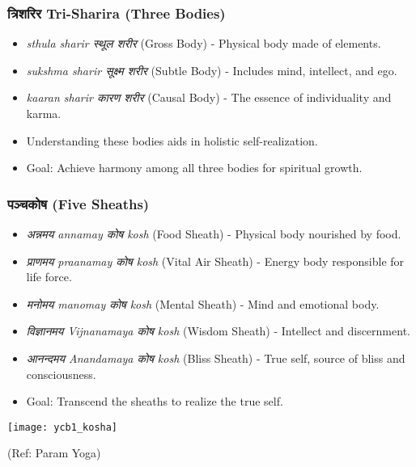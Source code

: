 \begin{frame}[fragile]\frametitle{त्रिशरिर  Tri-Sharira (Three Bodies)}

      \begin{itemize}
		\item \textit{sthula sharir स्थूल  शरीर } (Gross Body) - Physical body made of elements.
		\item \textit{sukshma sharir सूक्ष्म  शरीर } (Subtle Body) - Includes mind, intellect, and ego.
		\item \textit{kaaran sharir कारण  शरीर } (Causal Body) - The essence of individuality and karma.
		\item Understanding these bodies aids in holistic self-realization.
		\item Goal: Achieve harmony among all three bodies for spiritual growth.
	  \end{itemize}

\end{frame}

\begin{frame}[fragile]\frametitle{पञ्चकोष   (Five Sheaths)}

      \begin{itemize}
		\item \textit{अन्नमय  annamay कोष  kosh} (Food Sheath) - Physical body nourished by food.
		\item \textit{प्राणमय  praanamay  कोष  kosh} (Vital Air Sheath) - Energy body responsible for life force.
		\item \textit{मनोमय  manomay कोष kosh } (Mental Sheath) - Mind and emotional body.
		\item \textit{विज्ञानमय Vijnanamaya कोष  kosh} (Wisdom Sheath) - Intellect and discernment.
		\item \textit{आनन्दमय Anandamaya कोष  kosh} (Bliss Sheath) - True self, source of bliss and consciousness.
		\item Goal: Transcend the sheaths to realize the true self.
	  \end{itemize}

      \begin{center}
        \texttt{[image: ycb1\_kosha]}

		{\tiny (Ref: Param Yoga)}		
        \end{center}
\end{frame}

